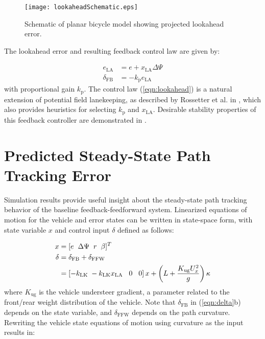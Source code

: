 \begin{figure}[h]
\centering
\texttt{[image: lookaheadSchematic.eps]}
\caption{Schematic of planar bicycle model showing projected lookahead error.}
\label{fig:lookaheadSchematic}
\end{figure}

The lookahead error and resulting feedback control law are given by:

\begin{subequations}
\label{eqn:lookahead}
\begin{align}
	e_\mathrm{LA}&=e+x_\mathrm{LA}\Delta\Psi \\
	\delta_\mathrm{FB} &= -k_\mathrm{p}e_\mathrm{LA}
\end{align}
\end{subequations}
with proportional gain $k_\mathrm{p}$. The control law (\ref{eqn:lookahead}) is a natural extension of potential field lanekeeping, as described by Rossetter et al. in \cite{rosseter}, which also provides heuristics for 
selecting $k_\mathrm{p}$ and $x_\mathrm{LA}$. Desirable stability properties of this feedback controller are demonstrated in \cite{talvala}. 

\section{Predicted Steady-State Path Tracking Error}
\label{sec:predSS}

Simulation results provide useful insight about the steady-state path tracking behavior of the baseline feedback-feedforward system. 
Linearized equations of motion for the vehicle and error states can be written in state-space form, with state variable $x$ and control input $\delta$ defined as follows:

\begin{subequations}
\label{eqn:delta}
\begin{align}
		     x &= [e \hspace{2 mm} \Delta\Psi \hspace{2 mm} r \hspace{2 mm} \beta]^T \\
        \delta &=\delta_\mathrm{FB}+\delta_\mathrm{FFW} \\
               &=\left[-k_\mathrm{LK} \hspace{1 mm} -k_\mathrm{LK} x_\mathrm{LA} \hspace{3 mm} 0 \hspace{3 mm} 0\right] x+\left(L+\frac{K_\mathrm{ug} U_x^2}{g}\right) \kappa
\end{align}
\end{subequations}
 where $K_\mathrm{ug}$ is the vehicle understeer gradient, a parameter related to the front/rear weight distribution of the vehicle.
Note that $\delta_\mathrm{FB}$ in (\ref{eqn:delta}b) depends on the state variable, and $\delta_\mathrm{FFW}$ depends on the path curvature. Rewriting  
the vehicle state equations of motion using curvature as the input results in:

